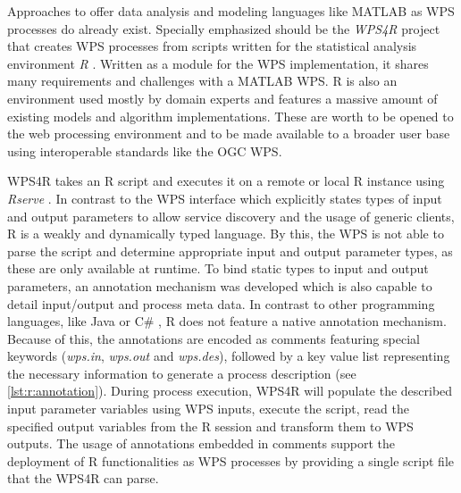   Approaches to offer data analysis and modeling languages like MATLAB as \ac{WPS} processes do already exist. Specially emphasized should be the \emph{WPS4R} \citep{wps4r} project that creates WPS processes from scripts written for the statistical analysis environment \emph{R} \citep{gnur}. Written as a module for the \ftn \ac{WPS} implementation, it shares many requirements and challenges with a MATLAB WPS. R is also an environment used mostly by domain experts and features a massive amount of existing models and algorithm implementations. These are worth to be opened to the web processing environment and to be made available to a broader user base using interoperable standards like the \ac{OGC} \acl{WPS}.

  

  WPS4R takes an R script and executes it on a remote or local R instance using \emph{Rserve} \citep{rserve}. In contrast to the \ac{WPS} interface which explicitly states types of input and output parameters to allow service discovery and the usage of generic clients, R is a weakly and dynamically typed language. By this, the \ac{WPS} is not able to parse the script and determine appropriate input and output parameter types, as these are only available at runtime. To bind static types to input and output parameters, an annotation mechanism was developed which is also capable to detail input/output and process meta data. In contrast to other programming languages, like Java \citep{jsr175} or C\# \citep{ecma335}, R does not feature a native annotation mechanism. Because of this, the annotations are encoded as comments featuring special keywords (\emph{wps.in}, \emph{wps.out} and \emph{wps.des}), followed by a key value list representing the necessary information to generate a process description (see \cref{lst:r:annotation}). During process execution, WPS4R will populate the described input parameter variables using \ac{WPS} inputs, execute the script, read the specified output variables from the R session and transform them to WPS outputs. The usage of annotations embedded in comments support the deployment of R functionalities as WPS processes by providing a single script file that the WPS4R can parse.

